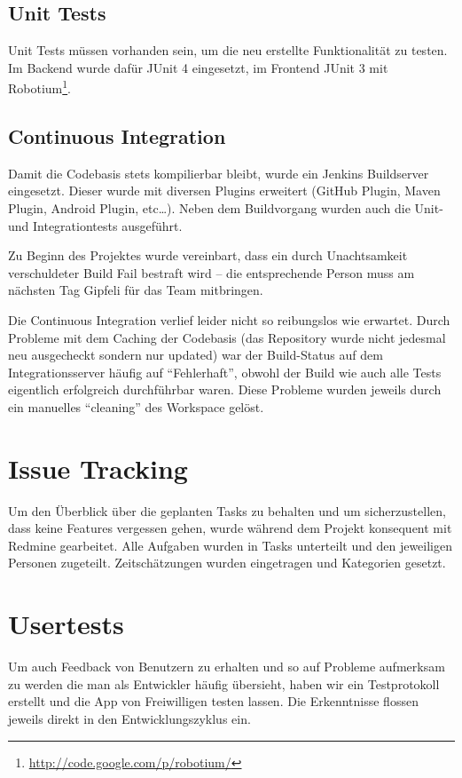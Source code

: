 \documentclass[10pt,a4paper]{scrartcl}
\begin{document}
\subsection{Unit Tests}

Unit Tests müssen vorhanden sein, um die neu erstellte Funktionalität zu testen. Im Backend wurde
dafür JUnit 4 eingesetzt, im Frontend JUnit 3 mit
Robotium\footnote{\url{http://code.google.com/p/robotium/}}.

\subsection{Continuous Integration}

Damit die Codebasis stets kompilierbar bleibt, wurde ein Jenkins Buildserver eingesetzt. Dieser
wurde mit diversen Plugins erweitert (GitHub Plugin, Maven Plugin, Android Plugin, etc\ldots). Neben
dem Buildvorgang wurden auch die Unit- und Integrationtests ausgeführt.

Zu Beginn des Projektes wurde vereinbart, dass ein durch Unachtsamkeit verschuldeter Build Fail
bestraft wird -- die entsprechende Person muss am nächsten Tag Gipfeli für das Team mitbringen.

Die Continuous Integration verlief leider nicht so reibungslos wie erwartet. Durch Probleme mit dem
Caching der Codebasis (das Repository wurde nicht jedesmal neu ausgecheckt sondern nur updated) war
der Build-Status auf dem Integrationsserver häufig auf "`Fehlerhaft"', obwohl der Build wie auch
alle Tests eigentlich erfolgreich durchführbar waren. Diese Probleme wurden jeweils durch ein
manuelles "`cleaning"' des Workspace gelöst.

\section{Issue Tracking}

Um den Überblick über die geplanten Tasks zu behalten und um sicherzustellen, dass keine Features
vergessen gehen, wurde während dem Projekt konsequent mit Redmine gearbeitet. Alle Aufgaben wurden
in Tasks unterteilt und den jeweiligen Personen zugeteilt. Zeitschätzungen wurden eingetragen und
Kategorien gesetzt.

\section{Usertests}

Um auch Feedback von Benutzern zu erhalten und so auf Probleme aufmerksam zu werden die man als
Entwickler häufig übersieht, haben wir ein Testprotokoll erstellt und die App von Freiwilligen
testen lassen. Die Erkenntnisse flossen jeweils direkt in den Entwicklungszyklus ein.
\end{document}
